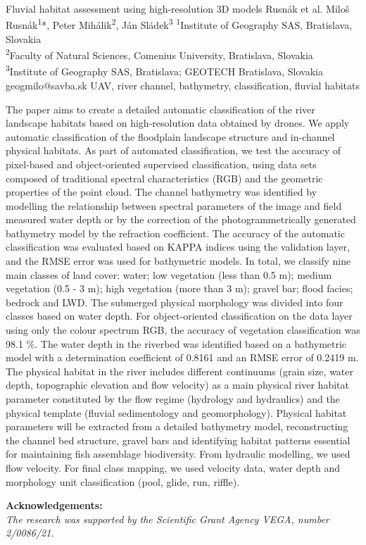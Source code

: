 \abstract
{Fluvial habitat assessment using high-resolution 3D models} %
{Rusnák et al.} %
{Miloš Rusnák\textsuperscript{1}*, Peter Mihálik\textsuperscript{2}, Ján Sládek\textsuperscript{3}} %
{\TLtag} %
{
\textsuperscript{1}Institute of Geography SAS, Bratislava, Slovakia\\
\textsuperscript{2}Faculty of Natural Sciences, Comenius University, Bratislava, Slovakia\\
\textsuperscript{3}Institute of Geography SAS, Bratislava; GEOTECH Bratislava, Slovakia
} %
{geogmilo@savba.sk}  %
{UAV, river channel, bathymetry, classification, fluvial habitats}%
{The paper aims to create a detailed automatic classification of the river landscape habitats based on high-resolution data obtained by drones. We apply automatic classification of the floodplain landscape structure and in-channel physical habitats. As part of automated classification, we test the accuracy of pixel-based and object-oriented supervised classification, using data sets composed of traditional spectral characteristics (RGB) and the geometric properties of the point cloud. The channel bathymetry was identified by modelling the relationship between spectral parameters of the image and field measured water depth or by the correction of the photogrammetrically generated bathymetry model by the refraction coefficient. The accuracy of the automatic classification was evaluated based on KAPPA indices using the validation layer, and the RMSE error was used for bathymetric models. In total, we classify nine main classes of land cover: water; low vegetation (less than 0.5 m); medium vegetation (0.5 - 3 m); high vegetation (more than 3 m); gravel bar; flood facies; bedrock and LWD. The submerged physical morphology was divided into four classes based on water depth. For object-oriented classification on the data layer using only the colour spectrum RGB, the accuracy of vegetation classification was 98.1 \%. The water depth in the riverbed was identified based on a bathymetric model with a determination coefficient of 0.8161 and an RMSE error of 0.2419 m. The physical habitat in the river includes different continuums (grain size, water depth, topographic elevation and flow velocity) as a main physical river habitat parameter constituted by the flow regime (hydrology and hydraulics) and the physical template (fluvial sedimentology and geomorphology). Physical habitat parameters will be extracted from a detailed bathymetry model, reconstructing the channel bed structure, gravel bars and identifying habitat patterns essential for maintaining fish assemblage biodiversity. From hydraulic modelling, we used flow velocity. For final class mapping, we used velocity data, water depth and morphology unit classification (pool, glide, run, riffle).
	
\vspace{0.5em}
\noindent
\textbf{Acknowledgements:}\\
\textit{The research was supported by the Scientific Grant Agency VEGA, number 2/0086/21.}
}%
{}%

